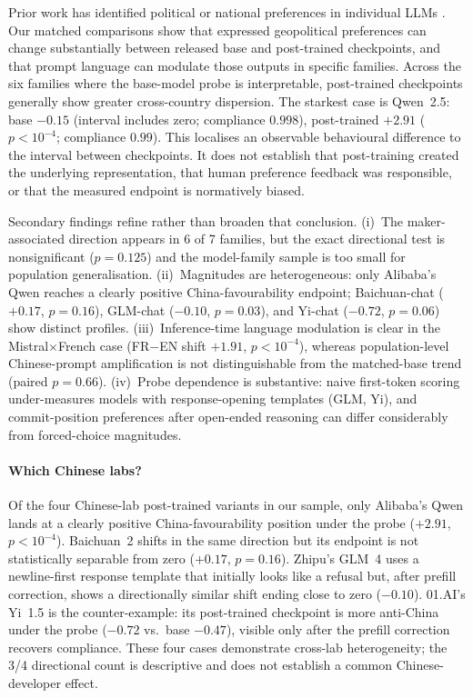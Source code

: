 \documentclass[letterpaper]{article}
\begin{document}
Prior work has identified political or national preferences in individual LLMs \citep{rozado2024political,feng2023pretraining,santurkar2023whose}. Our matched comparisons show that expressed geopolitical preferences can change substantially between released base and post-trained checkpoints, and that prompt language can modulate those outputs in specific families. Across the six families where the base-model probe is interpretable, post-trained checkpoints generally show greater cross-country dispersion. The starkest case is Qwen~2.5: base $-0.15$ (interval includes zero; compliance $0.998$), post-trained $+2.91$ ($p<10^{-4}$; compliance $0.99$). This localises an observable behavioural difference to the interval between checkpoints. It does not establish that post-training created the underlying representation, that human preference feedback was responsible, or that the measured endpoint is normatively biased.

Secondary findings refine rather than broaden that conclusion. (i)~The maker-associated direction appears in 6 of 7 families, but the exact directional test is nonsignificant ($p=0.125$) and the model-family sample is too small for population generalisation. (ii)~Magnitudes are heterogeneous: only Alibaba's Qwen reaches a clearly positive China-favourability endpoint; Baichuan-chat ($+0.17$, $p=0.16$), GLM-chat ($-0.10$, $p=0.03$), and Yi-chat ($-0.72$, $p=0.06$) show distinct profiles. (iii)~Inference-time language modulation is clear in the Mistral$\times$French case (FR$-$EN shift $+1.91$, $p<10^{-4}$), whereas population-level Chinese-prompt amplification is not distinguishable from the matched-base trend (paired $p=0.66$). (iv)~Probe dependence is substantive: naive first-token scoring under-measures models with response-opening templates (GLM, Yi), and commit-position preferences after open-ended reasoning can differ considerably from forced-choice magnitudes.

\paragraph{Which Chinese labs?} Of the four Chinese-lab post-trained variants in our sample, only Alibaba's Qwen lands at a clearly positive China-favourability position under the probe ($+2.91$, $p<10^{-4}$). Baichuan~2 shifts in the same direction but its endpoint is not statistically separable from zero ($+0.17$, $p=0.16$). Zhipu's GLM~4 uses a newline-first response template that initially looks like a refusal but, after prefill correction, shows a directionally similar shift ending close to zero ($-0.10$). 01.AI's Yi~1.5 is the counter-example: its post-trained checkpoint is more anti-China under the probe ($-0.72$ vs.\ base $-0.47$), visible only after the prefill correction recovers compliance. These four cases demonstrate cross-lab heterogeneity; the 3/4 directional count is descriptive and does not establish a common Chinese-developer effect.
\end{document}
